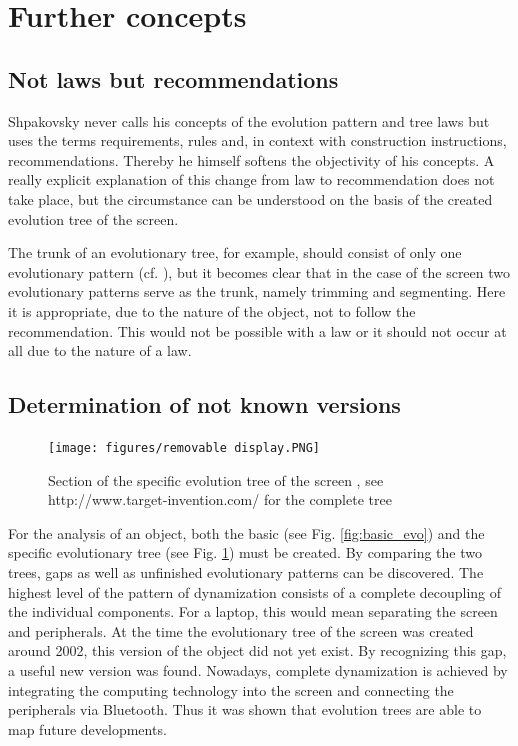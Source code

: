 \documentclass[11pt,a4paper]{article}
\begin{document}
\section{Further concepts}

\subsection{Not laws but recommendations}

Shpakovsky never calls his concepts of the evolution pattern and tree laws but uses the terms requirements, rules and, in context with construction instructions, recommendations. Thereby he himself softens the objectivity of his concepts. A really explicit explanation of this change from law to recommendation does not take place, but the circumstance can be understood on the basis of the created evolution tree of the screen.

The trunk of an evolutionary tree, for example, should consist of only one evolutionary pattern (cf. \cite[p. 122f]{Shpakovsky2016}), but it becomes clear that in the case of the screen two evolutionary patterns serve as the trunk, namely trimming and segmenting.
Here it is appropriate, due to the nature of the object, not to follow the recommendation. This would not be possible with a law or it should not occur at all due to the nature of a law.

\subsection{Determination of not known versions}

\begin{figure}[htb]
	\centering
	\texttt{[image: figures/removable display.PNG]}
	\caption{\small Section of the specific evolution tree of the screen \cite{Shpakovsky2016}, see http://www.target-invention.com/ for the complete tree}
	\label{fig:spec_evo}
\end{figure}


For the analysis of an object, both the basic (see Fig. \ref{fig:basic_evo}) and the specific evolutionary tree (see Fig. \ref{fig:spec_evo}) must be created. By comparing the two trees, gaps as well as unfinished evolutionary patterns can be discovered. The highest level of the pattern of dynamization consists of a complete decoupling of the individual components. For a laptop, this would mean separating the screen and peripherals. At the time the evolutionary tree of the screen was created around 2002, this version of the object did not yet exist. By recognizing this gap, a useful new version was found. Nowadays, complete dynamization is achieved by integrating the computing technology into the screen and connecting the peripherals via Bluetooth. Thus it was shown that evolution trees are able to map future developments.
\end{document}
